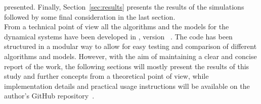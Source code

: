 \documentclass[../main.tex]{subfiles}
\begin{document}
presented.
Finally,
Section~\ref{sec:results} presents the results of the simulations followed by
some final consideration in the last section.\\
From a technical point of view all the algorithms and the models for the
dynamical systems have been developed in , version
~\cite{matlab}. The code has been structured in a modular way to
allow for easy testing and comparison of different algorithms and models.
However, with the aim of maintaining a clear and concise report of the work, 
the following sections will mostly present the results of this study and further concepts from a theoretical 
point of view,
while implementation details and practical usage instructions will be available on the author's GitHub repository~\cite{github}.
\end{document}
